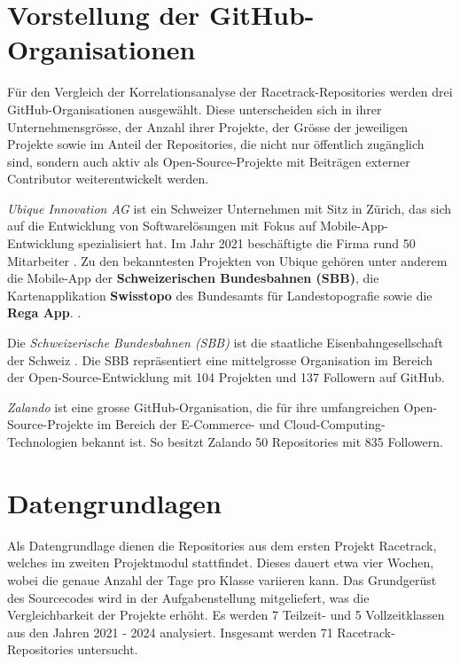 \section{Vorstellung der GitHub-Organisationen}
\label{sec:VorstellungGithubOrgs}
Für den Vergleich der Korrelationsanalyse der Racetrack-Repositories werden drei GitHub-Organisationen ausgewählt. Diese unterscheiden sich in ihrer Unternehmensgrösse, der Anzahl ihrer Projekte, der Grösse der jeweiligen Projekte sowie im Anteil der Repositories, die nicht nur öffentlich zugänglich sind, sondern auch aktiv als Open-Source-Projekte mit Beiträgen externer Contributor weiterentwickelt werden.

\textit{Ubique Innovation AG} ist ein Schweizer Unternehmen mit Sitz in Zürich, das sich auf die Entwicklung von Softwarelösungen mit Fokus auf Mobile-App-Entwicklung spezialisiert hat. Im Jahr 2021 beschäftigte die Firma rund 50 Mitarbeiter \cite{noauthor_mathias_2021}. Zu den bekanntesten Projekten von Ubique gehören unter anderem die Mobile-App der \textbf{Schweizerischen Bundesbahnen (SBB)}, die Kartenapplikation \textbf{Swisstopo} des Bundesamts für Landestopografie sowie die \textbf{Rega App}. \parencite{noauthor_apps_nodate}.


Die \textit{Schweizerische Bundesbahnen (SBB)} ist die staatliche Eisenbahngesellschaft der Schweiz \parencite{uvek_verkehr_energie_und_kommunikation_eidgenossisches_departement_fur_umwelt_schweizerische_nodate}. Die SBB repräsentiert eine mittelgrosse Organisation im Bereich der Open-Source-Entwicklung mit 104 Projekten und 137 Followern auf GitHub. \parencite{noauthor_swiss_nodate} 


\textit{Zalando} ist eine grosse GitHub-Organisation, die für ihre umfangreichen Open-Source-Projekte im Bereich der E-Commerce- und Cloud-Computing-Technologien bekannt ist. So besitzt Zalando 50 Repositories mit 835 Followern. \parencite{noauthor_zalando_nodate}


\section{Datengrundlagen}
\label{sec:Datengrundlagen}
Als Datengrundlage dienen die Repositories aus dem ersten Projekt Racetrack, welches im zweiten Projektmodul stattfindet. Dieses dauert etwa vier Wochen, wobei die genaue Anzahl der Tage pro Klasse variieren kann. Das Grundgerüst des Sourcecodes wird in der Aufgabenstellung mitgeliefert, was die Vergleichbarkeit der Projekte erhöht. Es werden 7 Teilzeit- und 5 Vollzeitklassen aus den Jahren 2021 - 2024 analysiert. Insgesamt werden 71 Racetrack-Repositories untersucht. 
